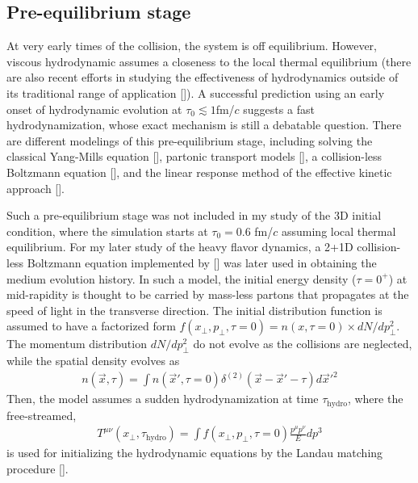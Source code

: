 \subsection{Pre-equilibrium stage}
At very early times of the collision, the system is off equilibrium. 
However, viscous hydrodynamic assumes a closeness to the local thermal equilibrium  (there are also recent efforts in studying the effectiveness of hydrodynamics outside of its traditional range of application []).
A successful prediction using an early onset of hydrodynamic evolution at $\tau_0\lesssim 1$fm/$c$ suggests a fast hydrodynamization, whose exact mechanism is still a debatable question. 
There are different modelings of this pre-equilibrium stage, including solving the classical Yang-Mills equation [], partonic transport models [], a collision-less Boltzmann equation [], and the linear response method of the effective kinetic approach [].

Such a pre-equilibrium stage was not included in my study of the 3D initial condition, where the simulation starts at $\tau_0 = 0.6$ fm/$c$ assuming local thermal equilibrium.
For my later study of the heavy flavor dynamics, a 2+1D collision-less Boltzmann equation implemented by [] was later used in obtaining the medium evolution history.
In such a model, the initial energy density ($\tau = 0^+$) at mid-rapidity  is thought to be carried by mass-less partons that propagates at the speed of light in the transverse direction. 
The initial distribution function is assumed to have a factorized form $f(x_\perp, p_\perp, \tau=0) = n(x, \tau=0) \times dN/dp_\perp^2$.
The momentum distribution $dN/dp_\perp^2$ do not evolve as the collisions are neglected, while the spatial density evolves as
\begin{eqnarray}
n(\vec{x}, \tau) = \int n(\vec{x}', \tau=0) \delta^{(2)}(\vec{x} - \vec{x}'- \tau) d\vec{x}'^2
\end{eqnarray}
Then, the model assumes a sudden hydrodynamization at time $\tau_{\textrm{hydro}}$, where the free-streamed,
\begin{eqnarray}
T^{\mu\nu}(x_\perp, \tau_{\textrm{hydro}}) = \int f(x_\perp, p_\perp, \tau=0) \frac{p^\mu p^\nu}{E} dp^3
\end{eqnarray}
is used for initializing the hydrodynamic equations by the Landau matching procedure [].

